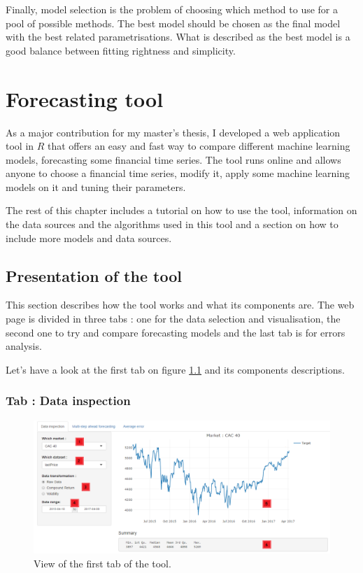 \documentclass[11pt,a4paper,oneside]{book}
\begin{document}
Finally, model selection is the problem of choosing which method to use for a pool of possible methods. The best model should be chosen as the final model with the best related parametrisations. What is described as the best model is a good balance between fitting rightness and simplicity. \cite{BenTaieb}








\chapter{Forecasting tool}

As a major contribution for my master's thesis, I developed a web application tool in \textbf{$R$} that offers an easy and fast way to compare different machine learning models, forecasting some financial time series. The tool runs online and allows anyone to choose a financial time series, modify it, apply some machine learning models on it and tuning their parameters. 

The rest of this chapter includes a tutorial on how to use the tool, information on the data sources and the algorithms used in this tool and a section on how to include more models and data sources. 


\section{Presentation of the tool}

This section describes how the tool works and what its components are. The web page is divided in three tabs : one for the data selection and visualisation, the second one to try and compare forecasting models and the last tab is for errors analysis. 

Let's have a look at the first tab on figure \ref{fig:tool1} and its components descriptions.

\subsection{Tab : Data inspection}


\begin{figure}[!h]
  \centering
    \includegraphics[scale=0.44]{img/tab1.png}
  \caption{View of the first tab of the tool.}
  \label{fig:tool1}
\end{figure}
\end{document}
